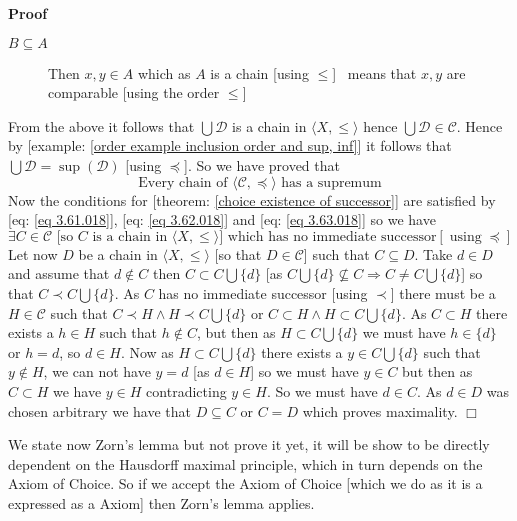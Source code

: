 \documentclass{book}
\newcommand{\nin}{\not\in}
\newcommand{\tmop}[1]{\ensuremath{\operatorname{#1}}}
\newenvironment{proof}{\noindent\textbf{Proof\ }}{\hspace*{\fill}$\Box$\medskip}
\begin{document}
\begin{proof}
\begin{description}
    \item[$B \subseteq A$] Then $x, y \in A$ which as $A$ is a chain [using
    $\leqslant$] \ means that $x, y$ are comparable [using the order
    $\leqslant$]
  \end{description}
  From the above it follows that $\bigcup \mathcal{D}$ is a chain in $\langle
  X, \leqslant \rangle$ hence $\bigcup \mathcal{D} \in \mathcal{C}$. Hence by
  [example: \ref{order example inclusion order and sup, inf}] it follows that
  $\bigcup \mathcal{D}= \sup (\mathcal{D})$ [using $\preccurlyeq$]. So we have
  proved that
  \begin{equation}
    \label{eq 3.63.018} \text{Every chain of } \langle \mathcal{C},
    \preccurlyeq \rangle \text{ has a supremum}
  \end{equation}
  Now the conditions for [theorem: \ref{choice existence of successor}] are
  satisfied by [eq: \ref{eq 3.61.018}], [eq: \ref{eq 3.62.018}] and [eq:
  \ref{eq 3.63.018}] so we have
  \begin{equation}
    \label{eq 3.64.018} \exists C \in \mathcal{C} \text{ [so $C \text{ is a
    chain in $\langle X, \leqslant \rangle$]}$ which has no immediate
    successor}  [\tmop{using} \preccurlyeq] 
  \end{equation}
  Let now $D$ be a chain in $\langle X, \leqslant \rangle$ [so that $D \in
  \mathcal{C}$] such that $C \subseteq D$. Take $d \in D$ and assume that $d
  \nin C$ then $C \subset C \bigcup \{ d \}$ [as $C \bigcup \{ d \} \nsubseteq
  C \Rightarrow C \neq C \bigcup \{ d \}$] so that $C \prec C \bigcup \{ d
  \}$. As $C$ has no immediate successor [using $\prec$] there must be a $H
  \in \mathcal{C}$ such that $C \prec H \wedge H \prec C \bigcup \{ d \}$ or
  $C \subset H \wedge H \subset C \bigcup \{ d \}$. As $C \subset H$ there
  exists a $h \in H$ such that $h \nin C$, but then as $H \subset C \bigcup \{
  d \}$ we must have $h \in \{ d \}$ or $h = d$, so $d \in H$. Now as $H
  \subset C \bigcup \{ d \}$ there exists a $y \in C \bigcup \{ d \}$ such
  that $y \nin H$, we can not have $y = d$ [as $d \in H$] so we must have $y
  \in C$ but then as $C \subset H$ we have $y \in H$ contradicting $y \in H$.
  So we must have $d \in C$. As $d \in D$ was chosen arbitrary we have that $D
  \subseteq C$ or $C = D$ which proves maximality.
\end{proof}

We state now Zorn's lemma but not prove it yet, it will be show to be directly
dependent on the Hausdorff maximal principle, which in turn depends on the
Axiom of Choice. So if we accept the Axiom of Choice [which we do as it is a
expressed as a Axiom] then Zorn's lemma applies.
\end{document}
